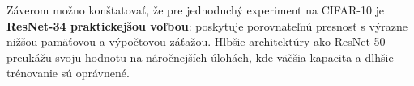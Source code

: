 \documentclass[12pt,a4paper]{article}
\begin{document}
Záverom možno konštatovať, že pre jednoduchý experiment na CIFAR-10 je
\textbf{ResNet-34 praktickejšou voľbou}: poskytuje porovnateľnú presnosť s výrazne
nižšou pamäťovou a výpočtovou záťažou. Hlbšie architektúry ako ResNet-50
preukážu svoju hodnotu na náročnejších úlohách, kde väčšia kapacita a dlhšie
trénovanie sú oprávnené.



\end{document}
